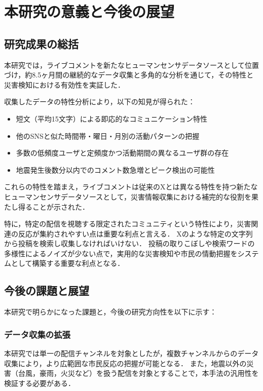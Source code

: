 \section{本研究の意義と今後の展望}

\subsection{研究成果の総括}

本研究では，ライブコメントを新たなヒューマンセンサデータソースとして位置づけ，約8.5ヶ月間の継続的なデータ収集と多角的な分析を通じて，その特性と災害検知における有効性を実証した．

収集したデータの特性分析により，以下の知見が得られた：
\begin{itemize}
    \item 短文（平均15文字）による即応的なコミュニケーション特性
    \item 他のSNSと似た時間帯・曜日・月別の活動パターンの把握
    \item 多数の低頻度ユーザと定頻度かつ活動期間の異なるユーザ群の存在
    \item 地震発生後数分以内でのコメント数急増とピーク検出の可能性
\end{itemize}

これらの特性を踏まえ，ライブコメントは従来のXとは異なる特性を持つ新たなヒューマンセンサデータソースとして，災害情報収集における補完的な役割を果たし得ることが示された．

特に，特定の配信を視聴する限定されたコミュニティという特性により，災害関連の反応が集約されやすい点は重要な利点と言える．
Xのような特定の文字列から投稿を検索し収集しなければいけない．
投稿の取りこぼしや検索ワードの多様性によるノイズが少ない点で，実用的な災害検知や市民の情動把握をシステムとして構築する重要な利点となる．

\subsection{今後の課題と展望}

本研究で明らかになった課題と，今後の研究方向性を以下に示す：

\subsubsection{データ収集の拡張}

本研究では単一の配信チャンネルを対象としたが，複数チャンネルからのデータ収集により，より広範囲な市民反応の把握が可能となる．
また，地震以外の災害（台風，豪雨，火災など）を扱う配信を対象とすることで，本手法の汎用性を検証する必要がある．

